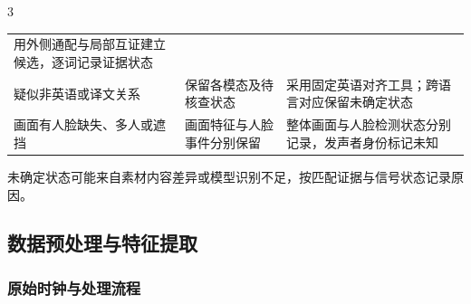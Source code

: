 \begin{PaperTable}{3}
\begin{table}[!htbp]
\begin{tabular}{@{}lll@{}}
\begin{minipage}[t]{\dimexpr 0.410000\linewidth-1.640000\tabcolsep\relax}
用外侧通配与局部互证建立候选，逐词记录证据状态\strut
\end{minipage}\tabularnewline
\begin{minipage}[t]{\dimexpr 0.240000\linewidth-0.960000\tabcolsep\relax}\raggedright
疑似非英语或译文关系\strut
\end{minipage} & \begin{minipage}[t]{\dimexpr 0.350000\linewidth-1.400000\tabcolsep\relax}\raggedright
保留各模态及待核查状态\strut
\end{minipage} & \begin{minipage}[t]{\dimexpr 0.410000\linewidth-1.640000\tabcolsep\relax}\raggedright
采用固定英语对齐工具；跨语言对应保留未确定状态\strut
\end{minipage}\tabularnewline
\begin{minipage}[t]{\dimexpr 0.240000\linewidth-0.960000\tabcolsep\relax}\raggedright
画面有人脸缺失、多人或遮挡\strut
\end{minipage} & \begin{minipage}[t]{\dimexpr 0.350000\linewidth-1.400000\tabcolsep\relax}\raggedright
画面特征与人脸事件分别保留\strut
\end{minipage} & \begin{minipage}[t]{\dimexpr 0.410000\linewidth-1.640000\tabcolsep\relax}\raggedright
整体画面与人脸检测状态分别记录，发声者身份标记未知\strut
\end{minipage}\tabularnewline
\bottomrule
\end{tabular}
\end{table}

\end{PaperTable}

未确定状态可能来自素材内容差异或模型识别不足，按匹配证据与信号状态记录原因。

\hypertarget{q1-ux6570ux636eux9884ux5904ux7406ux4e0eux7279ux5f81ux63d0ux53d6}{%
\subsection{数据预处理与特征提取}\label{q1-ux6570ux636eux9884ux5904ux7406ux4e0eux7279ux5f81ux63d0ux53d6}}

\hypertarget{q1-ux539fux59cbux65f6ux949fux4e0eux5904ux7406ux6d41ux7a0b}{%
\subsubsection{原始时钟与处理流程}\label{q1-ux539fux59cbux65f6ux949fux4e0eux5904ux7406ux6d41ux7a0b}}

